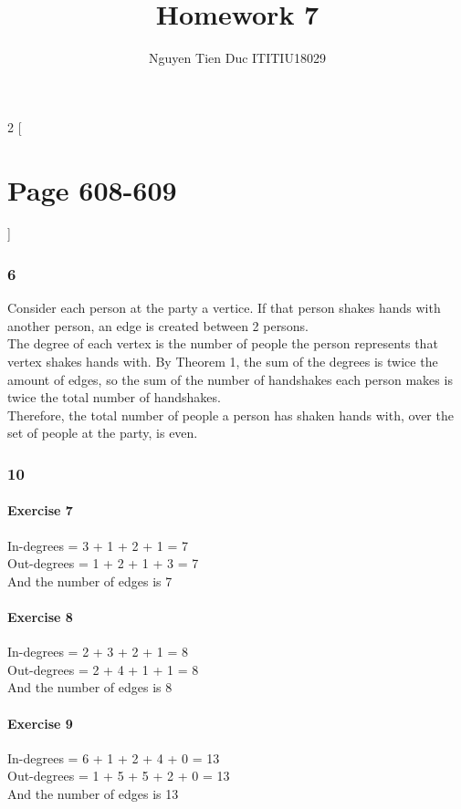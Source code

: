 \documentclass[12pt]{article}
\begin{document}
  \title{Homework 7}
  \author{Nguyen Tien Duc ITITIU18029}
  \maketitle
  \begin{multicols}{2}
    [\part*{Page 608-609}]
      \section*{6}
        Consider each person at the party a vertice. If that person shakes hands with another person, an edge is created between 2 persons.\\
        The degree of each vertex is the number of people the person represents that vertex shakes hands with.
        By Theorem 1, the sum of the degrees is twice the amount of edges, so the sum of the number of handshakes each person makes is twice the total number of handshakes. \\
        Therefore, the total number of people a person has shaken hands with, over the set of people at the party, is even.
      \section*{10}
        \subsection*{Exercise 7}
          In-degrees = 3 + 1 + 2 + 1 = 7 \\
          Out-degrees = 1 + 2 + 1 + 3 = 7 \\
          And the number of edges is 7
        \subsection*{Exercise 8}
          In-degrees = 2 + 3 + 2 + 1 = 8 \\
          Out-degrees = 2 + 4 + 1 + 1 = 8 \\
          And the number of edges is 8
        \subsection*{Exercise 9}
          In-degrees = 6 + 1 + 2 + 4 + 0 = 13 \\
          Out-degrees = 1 + 5 + 5 + 2 + 0 = 13 \\
          And the number of edges is 13


\end{multicols}
\end{document}

